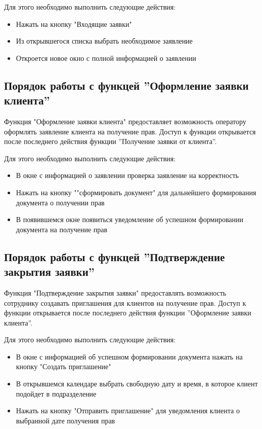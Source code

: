 \documentclass[russian, utf8, 12pt,pointsubsection,floatsubsection]{eskdtext}
\begin{document}
Для этого необходимо выполнить следующие действия:
\begin{itemize}
    \item Нажать на кнопку "Входящие заявки"
    \item Из открывшегося списка выбрать необходимое заявление
    \item Откроется новое окно с полной информацией о заявлении
\end{itemize}

\subsection{Порядок работы с функцей ''Оформление заявки клиента''}
Функция "Оформление заявки клиента" предоставляет возможность оператору оформлять заявление клиента на получение прав. Доступ к функции открывается после последнего действия функции ''Получение заявки от клиента''.

Для этого необходимо выполнить следующие действия:
\begin{itemize}
    \item В окне с информацией о заявлении проверка заявление на корректность
    \item Нажать на кнопку ""сформировать документ" для дальнейшего формирования документа о получении прав
    \item В появившемся окне появиться уведомление об успешном формировании документа на получение прав
\end{itemize}

\subsection{Порядок работы с функцей ''Подтверждение закрытия заявки''}
Функция "Подтверждение закрытия заявки" предоставлять возможность сотруднику создавать приглашения для клиентов на получение прав. Доступ к функции открывается после последнего действия функции ''Оформление заявки клиента''.

Для этого необходимо выполнить следующие действия:
\begin{itemize}
    \item В окне с информацией об успешном формировании документа нажать на кнопку "Создать приглашение"
    \item В открывшемся календаре выбрать свободную дату и время, в которое клиент подойдет в подразделение
    \item Нажать на кнопку "Отправить приглашение" для уведомления клиента о выбранной дате получения прав
\end{itemize}
\end{document}
